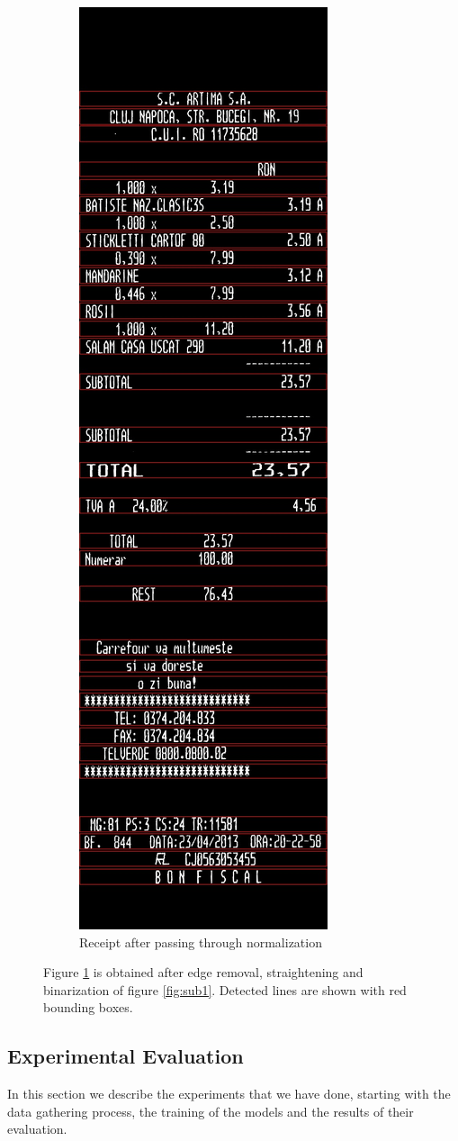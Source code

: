 \begin{figure}
\begin{subfigure}{0.45\linewidth}
  \includegraphics[width=.4\linewidth]{img/cleaned1.jpg}
  \caption{Receipt after passing through normalization}
  \label{fig:sub2}
\end{subfigure}
\caption{\label{fig:receipts}
Figure \ref{fig:sub2} is obtained after edge removal, straightening and binarization of figure \ref{fig:sub1}. Detected lines are shown with red bounding boxes.}
\label{fig:test}
\end{figure}


\subsection{Experimental Evaluation}
In this section we describe the experiments that we have done, starting with the data gathering process, the training of the models and the results of their evaluation.

